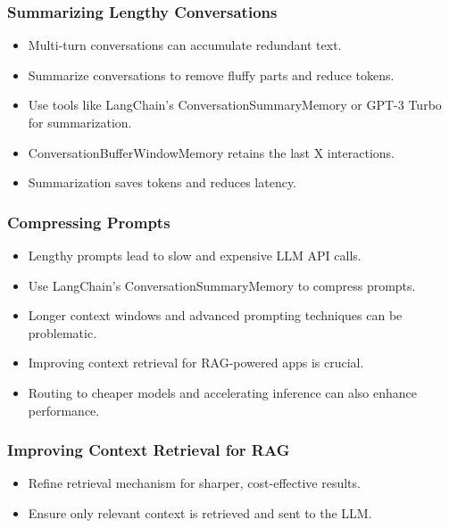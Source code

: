 \begin{frame}[fragile]\frametitle{Summarizing Lengthy Conversations}
    \begin{itemize}
        \item Multi-turn conversations can accumulate redundant text.
        \item Summarize conversations to remove fluffy parts and reduce tokens.
        \item Use tools like LangChain’s ConversationSummaryMemory or GPT-3 Turbo for summarization.
        \item ConversationBufferWindowMemory retains the last X interactions.
        \item Summarization saves tokens and reduces latency.
    \end{itemize}
\end{frame}

\begin{frame}[fragile]\frametitle{Compressing Prompts}
    \begin{itemize}
        \item Lengthy prompts lead to slow and expensive LLM API calls.
        \item Use LangChain’s ConversationSummaryMemory to compress prompts.
        \item Longer context windows and advanced prompting techniques can be problematic.
        \item Improving context retrieval for RAG-powered apps is crucial.
        \item Routing to cheaper models and accelerating inference can also enhance performance.
    \end{itemize}
\end{frame}

\begin{frame}[fragile]\frametitle{Improving Context Retrieval for RAG}
    \begin{itemize}
        \item Refine retrieval mechanism for sharper, cost-effective results.
        \item Ensure only relevant context is retrieved and sent to the LLM.
    \end{itemize}
\end{frame}

